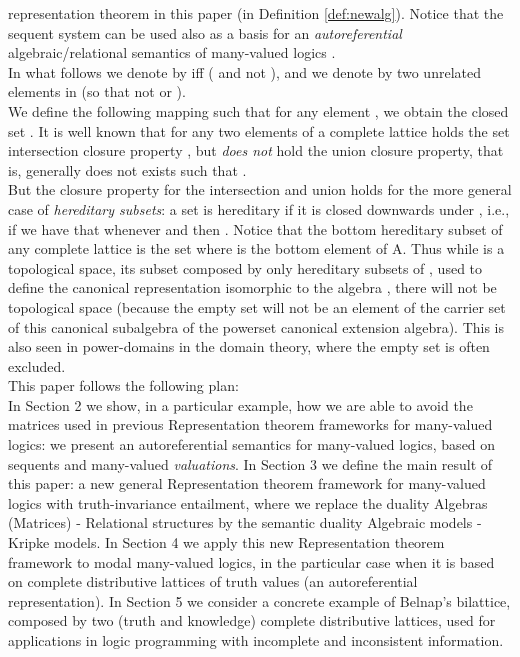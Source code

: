 \documentclass[10pt,twocolumn]{article}
\begin{document}
representation theorem in this paper (in Definition
\ref{def:newalg}). Notice that the sequent system can be used also
as a basis for an \emph{autoreferential} algebraic/relational
semantics of many-valued logics \cite{Majk06ml}.\\
In what follows we denote by  iff (
and not ), and we denote by  two
unrelated elements in  (so that not  or
).\\
We define the following mapping 
such that for any  element , we obtain the closed set
. It is well known
that for any two elements of a complete lattice  holds
the set intersection closure property , but \emph{does not} hold
the union closure property, that is, generally  does not exists   such
that . \\
But the closure property for the intersection and union holds for
the more general case of \emph{hereditary subsets}: a set  is hereditary if it is closed downwards under ,
i.e., if we have that whenever  and  then
. Notice that the bottom hereditary subset of any complete
lattice  is the set  where  is the
bottom element of A. Thus while  is a topological space, its
subset composed by only hereditary subsets of , used to define
the canonical representation isomorphic to the algebra ,
there will not be topological space (because the empty set will not
be an element of the carrier set of this canonical subalgebra of the
powerset canonical extension
algebra). This is also seen in power-domains in the domain theory, where the empty set is often excluded.\\
This paper follows the following plan:\\In Section 2 we show, in a
particular example, how we are able to avoid the matrices used
 in previous Representation theorem frameworks for many-valued logics: we present an autoreferential semantics for many-valued logics, based on
 sequents and many-valued \emph{valuations}. In Section 3 we
define the main result of this paper: a new general
 Representation theorem framework for many-valued logics with truth-invariance entailment, where we replace the duality
Algebras (Matrices) - Relational structures by the semantic duality
Algebraic models - Kripke models.
 In Section 4 we  apply this new Representation theorem framework  to
 modal many-valued logics, in the particular case when it is based on complete distributive lattices of truth
 values (an autoreferential representation). In Section 5 we consider a concrete example
 of Belnap's bilattice, composed by two (truth and knowledge) complete distributive lattices, used for  applications in logic programming
 with incomplete and inconsistent information.
\end{document}

